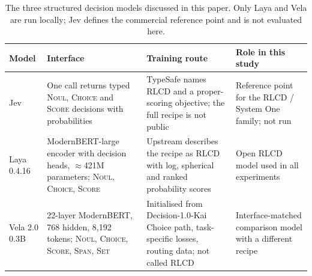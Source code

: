 \begin{table}[t]
\centering
\small
\caption{The three structured decision models discussed in this paper. Only
Laya and Vela are run locally; Jev defines the commercial reference point and
is not evaluated here.}
\label{tab:models}
\begin{tabular}{@{}p{1.5cm}p{4.1cm}p{4.6cm}p{4.4cm}@{}}
\toprule
Model & Interface & Training route & Role in this study \\
\midrule
Jev & One call returns typed \textsc{Noul}, \textsc{Choice} and \textsc{Score} decisions with probabilities & TypeSafe names RLCD and a proper-scoring objective; the full recipe is not public & Reference point for the RLCD / System One family; not run \\
Laya 0.4.16 & ModernBERT-large encoder with decision heads, $\approx$421M parameters; \textsc{Noul}, \textsc{Choice}, \textsc{Score} & Upstream describes the recipe as RLCD with log, spherical and ranked probability scores & Open RLCD model used in all experiments \\
Vela 2.0 0.3B & 22-layer ModernBERT, 768 hidden, 8{,}192 tokens; \textsc{Noul}, \textsc{Choice}, \textsc{Score}, \textsc{Span}, \textsc{Set} & Initialised from Decision-1.0-Kai Choice path, task-specific losses, routing data; not called RLCD & Interface-matched comparison model with a different recipe \\
\bottomrule
\end{tabular}
\end{table}
